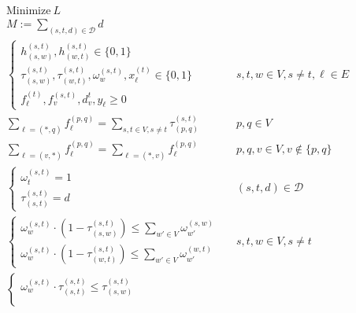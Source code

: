 \documentclass[a4paper,USenglish]{lipics-v2018}
\begin{document}
\begin{align}
& \text{Minimize} ~L \nonumber	&&\\
&M := \sum_{ (s,t,d) \in \mathcal{D}} d &&\\
&\begin{cases}
	h^{(s,t)}_{(s,w)}, h^{(s,t)}_{(w,t)}  \in \{0,1\} \\
	\tau^{(s,t)}_{(s,w)}, \tau^{(s,t)}_{(w,t)},
	\omega^{(s,t)}_{w},
	x^{(t)}_{\ell} 
 \in \{0,1\} \\
 f^{(t)}_{\ell}, f^{(s,t)}_{v}, d^{t}_v, y_{\ell}  \geq 0
\end{cases}
&&  s,t,w \in V, s \neq t, \ell \in E \label{LP:vardef}    
\\
&\sum_{\ell = (*,q)} f^{(p,q)}_{\ell} 
= \sum_{ s,t\in V, s\neq t} \tau^{(s,t)}_{(p,q)}
&&  p,q \in V
\label{LP:flowsink1}
 \\
 &\sum_{\ell = (v,*)} f^{(p,q)}_{\ell} = 
 \sum_{\ell = (*,v)} f^{(p,q)}_{\ell} 
 &&  p,q,v \in V, v \not\in \{p,q\}
 \label{LP:flowcons1}
 \\
 & 
 \begin{cases}
	 \omega^{(s,t)}_{t} = 1 \\
	 \tau^{(s,t)}_{(s,t)} = d
 \end{cases}
 &&  (s,t,d) \in \mathcal{D}
 \label{LP:wp_t}
 \\
 &
 \begin{cases*}
    \omega^{(s,t)}_{w} \cdot (1-\tau^{(s,t)}_{(s,w)}) \leq  \sum_{w' \in V} \omega^{(s,w)}_{w'}	\\
    \omega^{(s,t)}_{w} \cdot (1-\tau^{(s,t)}_{(w,t)})  \leq  \sum_{w' \in V} \omega^{(w,t)}_{w'}	    
 \end{cases*}	 
 &&  s,t,w \in V, s\neq t
 \label{LP:segments}
  \\
 &
 \begin{cases*}
  \omega^{(s,t)}_{w} \cdot \tau^{(s,t)}_{(s,t)} \leq \tau^{(s,t)}_{(s,w)}	\\

\end{cases*}
\end{align}
\end{document}
